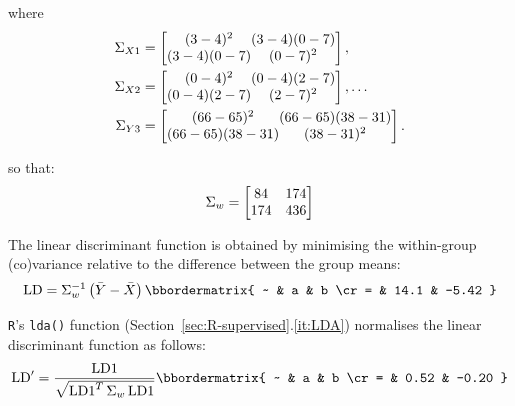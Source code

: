 \noindent where
\begin{align}
  \Sigma_{X1} & =
  \left[
  \begin{array}{@{}c@{}c@{}}
    (3-4)^2 & (3-4)(0-7) \cr
    (3-4)(0-7) & (0-7)^2
  \end{array}
  \right], \\
  \Sigma_{X2} & =
  \left[
  \begin{array}{@{}c@{}c@{}}
    (0-4)^2 & (0-4)(2-7) \cr
    (0-4)(2-7) & (2-7)^2
  \end{array}
  \right], \ldots \\
  \Sigma_{Y3} & =
  \left[
  \begin{array}{@{}c@{}c@{}}
    (66-65)^2 & (66-65)(38-31) \cr
    (66-65)(38-31) & (38-31)^2
  \end{array}
  \right].
\end{align}

\noindent so that:
\begin{equation}
  \Sigma_w =   \left[
  \begin{array}{@{}cc@{}}
    84 & 174 \cr
    174 & 436
  \end{array}
  \right]  
\end{equation}

The linear discriminant function is obtained by minimising the
within-group (co)variance relative to the difference between the group
means:
\begin{equation}
  \mbox{LD} = \Sigma_w^{-1} \left(\bar{Y}-\bar{X}\right)
  \bbordermatrix{
    ~ & a & b \cr
    = & 14.1 & -5.42 }
  \label{eq:LD}
\end{equation}

\texttt{R}'s \texttt{lda()} function
(Section~\ref{sec:R-supervised}.\ref{it:LDA}) normalises the linear
discriminant function as follows:
\begin{equation}
  \mbox{LD}' = \frac{\mbox{LD1}}{\sqrt{\mbox{LD1}^T\,\Sigma_w\,\mbox{LD1}}}
  \bbordermatrix{
    ~ & a & b \cr
    = & 0.52 & -0.20
  }
  \label{eq:LD1'}
\end{equation}

